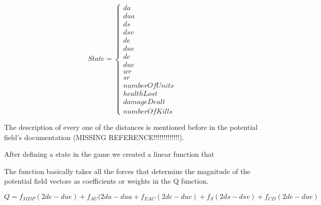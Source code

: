 \begin{displaymath}
                       State = \begin{cases}
                         da \\  dua \\  ds \\  dsv \\ de \\ due \\ dc \\ duc \\ wr \\ sr \\ numberOfUnits \\ healthLost \\ damageDealt \\ numberOfKills
                      \end{cases}
\end{displaymath}

The description of every one of the distances is mentioned before in the potential field's documentation (MISSING REFERENCE!!!!!!!!!!!!!). 

After defining a state in the game we created a linear function that 



The function basically takes all the forces that determine the magnitude of the potential field vectors as coefficients or weights in the Q function. 

$Q = f_{MDP} (2de - due)+f_{AU} (2da - dua+f_{EAC} (2dc - duc)+f_{S}  (2ds - dsv)+f_{CD} (2de - due)$





